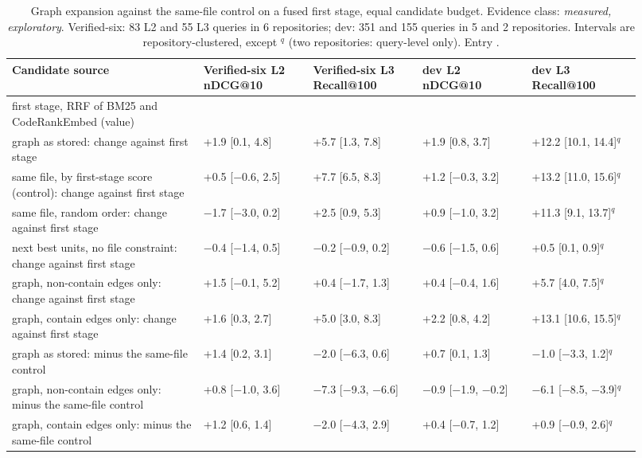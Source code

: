 \begin{table}[t]
\centering\small
\caption{Graph expansion against the same-file control on a fused first stage, equal candidate budget. Evidence class: \emph{measured, exploratory}. Verified-six: 83 L2 and 55 L3 queries in 6 repositories; dev: 351 and 155 queries in 5 and 2 repositories. Intervals are repository-clustered, except $^q$ (two repositories: query-level only). Entry .}
\label{tab:graph_role}
\begin{tabular}{>{\raggedright\arraybackslash}p{0.28\linewidth}>{\raggedleft\arraybackslash}p{0.16\linewidth}>{\raggedleft\arraybackslash}p{0.16\linewidth}>{\raggedleft\arraybackslash}p{0.16\linewidth}>{\raggedleft\arraybackslash}p{0.16\linewidth}}
\toprule
Candidate source & Verified-six L2 nDCG@10 & Verified-six L3 Recall@100 & dev L2 nDCG@10 & dev L3 Recall@100 \\
\midrule
first stage, RRF of BM25 and CodeRankEmbed (value) & 23.0 & 37.8 & 25.1 & 42.1 \\
\midrule
graph as stored: change against first stage & +1.9 [0.1, 4.8] & +5.7 [1.3, 7.8] & +1.9 [0.8, 3.7] & +12.2 [10.1, 14.4]$^q$ \\
same file, by first-stage score (control): change against first stage & +0.5 [$-$0.6, 2.5] & +7.7 [6.5, 8.3] & +1.2 [$-$0.3, 3.2] & +13.2 [11.0, 15.6]$^q$ \\
same file, random order: change against first stage & $-$1.7 [$-$3.0, 0.2] & +2.5 [0.9, 5.3] & +0.9 [$-$1.0, 3.2] & +11.3 [9.1, 13.7]$^q$ \\
next best units, no file constraint: change against first stage & $-$0.4 [$-$1.4, 0.5] & $-$0.2 [$-$0.9, 0.2] & $-$0.6 [$-$1.5, 0.6] & +0.5 [0.1, 0.9]$^q$ \\
graph, non-contain edges only: change against first stage & +1.5 [$-$0.1, 5.2] & +0.4 [$-$1.7, 1.3] & +0.4 [$-$0.4, 1.6] & +5.7 [4.0, 7.5]$^q$ \\
graph, contain edges only: change against first stage & +1.6 [0.3, 2.7] & +5.0 [3.0, 8.3] & +2.2 [0.8, 4.2] & +13.1 [10.6, 15.5]$^q$ \\
\midrule
graph as stored: minus the same-file control & +1.4 [0.2, 3.1] & $-$2.0 [$-$6.3, 0.6] & +0.7 [0.1, 1.3] & $-$1.0 [$-$3.3, 1.2]$^q$ \\
graph, non-contain edges only: minus the same-file control & +0.8 [$-$1.0, 3.6] & $-$7.3 [$-$9.3, $-$6.6] & $-$0.9 [$-$1.9, $-$0.2] & $-$6.1 [$-$8.5, $-$3.9]$^q$ \\
graph, contain edges only: minus the same-file control & +1.2 [0.6, 1.4] & $-$2.0 [$-$4.3, 2.9] & +0.4 [$-$0.7, 1.2] & +0.9 [$-$0.9, 2.6]$^q$ \\
\bottomrule
\end{tabular}
\end{table}
